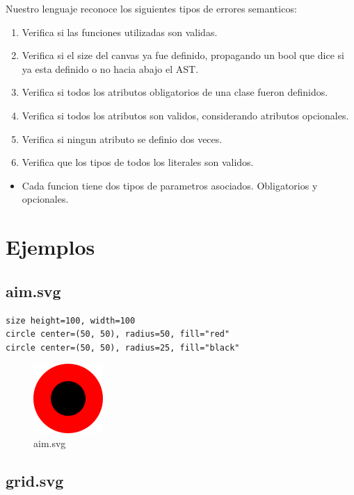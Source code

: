 \documentclass{article}
\theoremstyle{definition}
\theoremstyle{remark}
\begin{document}
Nuestro lenguaje reconoce los siguientes tipos de errores semanticos:

\begin{enumerate}
	\item Verifica si las funciones utilizadas son validas.
	\item Verifica si el size del canvas ya fue definido, propagando un bool que dice si ya esta definido o no hacia abajo el AST.
	\item Verifica si todos los atributos obligatorios de una clase fueron definidos.
	\item Verifica si todos los atributos son validos, considerando atributos opcionales.
	\item Verifica si ningun atributo se definio dos veces.
	\item Verifica que los tipos de todos los literales son validos.
\end{enumerate}

\begin{itemize}
	\item Cada funcion tiene dos tipos de parametros asociados. Obligatorios y opcionales.
\end{itemize}

\pagebreak

\section{Ejemplos}

\subsection{aim.svg}

\begin{verbatim}
size height=100, width=100
circle center=(50, 50), radius=50, fill="red"
circle center=(50, 50), radius=25, fill="black"
\end{verbatim}

\begin{figure}[H]
  \centering
  \includegraphics[scale=1]{images/aim}
  \caption{aim.svg}
\end{figure}

\subsection{grid.svg}
\end{document}
